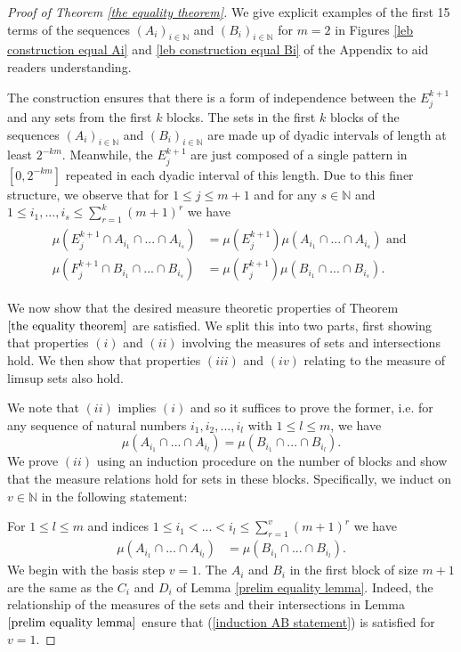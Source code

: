 \documentclass[12pt]{article}
\begin{document}
\begin{proof}[Proof of Theorem \ref{the equality theorem}]
We give explicit examples of the first 15 terms of the sequences $(A_i)_{i \in \mathbb{N}}$ and $(B_i)_{i \in \mathbb{N}}$ for $m=2$ in Figures \ref{leb construction equal Ai} and \ref{leb construction equal Bi} of the Appendix to aid readers understanding.

The construction ensures that there is a form of independence between the $E_{j}^{k+1}$ and any sets from the first $k$ blocks. The sets in the first $k$ blocks of the sequences $(A_i)_{i \in \mathbb{N}}$ and $(B_i)_{i \in \mathbb{N}}$ are made up of dyadic intervals of length at least $2^{-km}$. Meanwhile, the $E_j^{k+1}$ are just composed of a single pattern in $[0,2^{-km}]$ repeated in each dyadic interval of this length. Due to this finer structure, we observe that for $1 \leq j \leq m+1$ and for any $s\in \mathbb{N}$ and $1 \leq i_1,...,i_s \leq \sum_{r=1}^{k}(m+1)^r$ we have
\begin{align}
\begin{split} \label{EA independence}
    \mu \left( E_j^{k+1} \cap A_{i_1} \cap...\cap A_{i_s}  \right) &= \mu \left(E_j^{k+1} \right) \mu(A_{i_1} \cap...\cap A_{i_s}) \text{ and } \\ 
    \mu \left( F_j^{k+1} \cap B_{i_1} \cap ... \cap B_{i_s}   \right) &= \mu \left(F_j^{k+1} \right) \mu( B_{i_1} \cap ... \cap B_{i_s}) .
    \end{split}
\end{align}


    We now show that the desired measure theoretic properties of Theorem $\ref{the equality theorem}$ are satisfied. We split this into two parts, first showing that properties $(i)$ and $(ii)$ involving the measures of sets and intersections hold. We then show that properties $(iii)$ and $(iv)$ relating to the measure of limsup sets also hold.
    
    We note that $(ii)$ implies $(i)$ and so it suffices to prove the former, i.e. for any sequence of natural numbers $i_1,i_2,...,i_l$ with $1 \leq l \leq m$, we have 
     \[\mu(A_{i_1} \cap ... \cap A_{i_l})  = \mu(B_{i_1} \cap ... \cap B_{i_l}).\]
    We prove $(ii)$ using an induction procedure on the number of blocks and show that the measure relations hold for sets in these blocks. Specifically, we induct on $v \in \mathbb{N}$ in the following statement:
    
    For $1 \leq l \leq m$ and indices $ 1 \leq i_1<...<i_l \leq \sum_{r=1}^v (m+1)^r$ we have
\begin{align}\label{induction AB statement}
         \mu(A_{i_1} \cap ... \cap A_{i_l}) & = \mu(B_{i_1} \cap ... \cap B_{i_l}). 
\end{align}
We begin with the basis step $v=1$. The $A_i$ and $B_i$ in the first block of size $m+1$ are the same as the $C_i$ and $D_i$ of Lemma \ref{prelim equality lemma}. Indeed, the relationship of the measures of the sets and their intersections in Lemma $\ref{prelim equality lemma}$ ensure that (\ref{induction AB statement}) is satisfied for $v=1$.


\end{proof}
\end{document}
